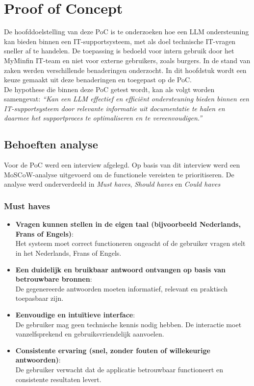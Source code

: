 \chapter{Proof of Concept}
\label{ch:proof-of-concept}

De hoofddoelstelling van deze PoC is te onderzoeken hoe een LLM ondersteuning kan bieden binnen een IT-supportsysteem, met als doel technische IT-vragen sneller af te handelen. De toepassing is bedoeld voor intern gebruik door het MyMinfin IT-team en niet voor externe gebruikers, zoals burgers. In de stand van zaken werden verschillende benaderingen onderzocht. In dit hoofdstuk wordt een keuze gemaakt uit deze benaderingen en toegepast op de PoC.
\\[1em]
De hypothese die binnen deze PoC getest wordt, kan als volgt worden samengevat:
\textit{“Kan een LLM effectief en efficiënt ondersteuning bieden binnen een IT-supportsysteem door relevante informatie uit documentatie te halen en daarmee het supportproces te optimaliseren en te vereenvoudigen.”}

\section{Behoeften analyse}
Voor de PoC werd een interview afgelegd. Op basis van dit interview werd een MoSCoW-analyse uitgevoerd om de functionele vereisten te prioritiseren. De analyse werd onderverdeeld in \textit{Must haves}, \textit{Should haves} en \textit{Could haves}

\subsection{Must haves}
\begin{itemize}
    \item \textbf{Vragen kunnen stellen in de eigen taal (bijvoorbeeld Nederlands, Frans of Engels)}:\\ 
    Het systeem moet correct functioneren ongeacht of de gebruiker vragen stelt in het Nederlands, Frans of Engels.
    \item \textbf{Een duidelijk en bruikbaar antwoord ontvangen op basis van betrouwbare bronnen}:\\ 
    De gegenereerde antwoorden moeten informatief, relevant en praktisch toepasbaar zijn.
    \item \textbf{Eenvoudige en intuïtieve interface}:\\  
    De gebruiker mag geen technische kennis nodig hebben. De interactie moet vanzelfsprekend en gebruiksvriendelijk aanvoelen.
    \item \textbf{Consistente ervaring (snel, zonder fouten of willekeurige antwoorden)}:\\  
    De gebruiker verwacht dat de applicatie betrouwbaar functioneert en consistente resultaten levert.
\end{itemize}

